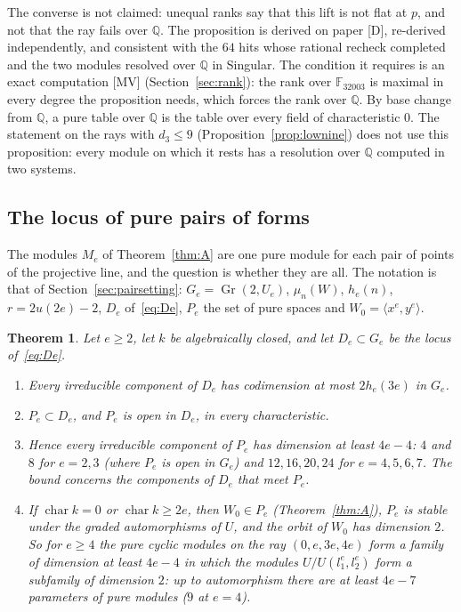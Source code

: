 \documentclass[11pt]{article}
\newtheorem{thmletter}{Theorem}
\theoremstyle{definition}
\theoremstyle{remark}
\newcommand{\Q}{\mathbb{Q}}
\newcommand{\F}{\mathbb{F}}
\newcommand{\ch}{\operatorname{char}}
\begin{document}
The converse is not claimed: unequal ranks say that this lift is not flat at $p$, and not that the ray fails over $\Q$. The proposition is derived on paper [D], re-derived independently, and consistent with the $64$ hits whose rational recheck completed and the two modules resolved over $\Q$ in Singular. The condition it requires is an exact computation [MV] (Section~\ref{sec:rank}): the rank over $\F_{32003}$ is maximal in every degree the proposition needs, which forces the rank over $\Q$. By base change from $\Q$, a pure table over $\Q$ is the table over every field of characteristic $0$. The statement on the rays with $d_3\le9$ (Proposition~\ref{prop:lownine}) does not use this proposition: every module on which it rests has a resolution over $\Q$ computed in two systems.

\subsection{The locus of pure pairs of forms}
\label{sec:family}

The modules $M_e$ of Theorem~\ref{thm:A} are one pure module for each pair of points of the projective line, and the question is whether they are all. The notation is that of Section~\ref{sec:pairsetting}: $G_e=\operatorname{Gr}(2,U_e)$, $\mu_n(W)$, $h_e(n)$, $r=2u(2e)-2$, $D_e$ of~\eqref{eq:De}, $P_e$ the set of pure spaces and $W_0=\langle x^e,y^e\rangle$.

\begin{thmletter}\label{thm:family}
Let $e\ge2$, let $k$ be algebraically closed, and let $D_e\subset G_e$ be the locus of~\eqref{eq:De}.
\begin{enumerate}
\item[(a)] Every irreducible component of $D_e$ has codimension at most $2h_e(3e)$ in $G_e$.
\item[(b)] $P_e\subset D_e$, and $P_e$ is open in $D_e$, in every characteristic.
\item[(c)] Hence every irreducible component of $P_e$ has dimension at least $4e-4$: $4$ and $8$ for $e=2,3$ (where $P_e$ is open in $G_e$) and $12,16,20,24$ for $e=4,5,6,7$. The bound concerns the components of $D_e$ that meet $P_e$.
\item[(d)] If $\ch k=0$ or $\ch k\ge2e$, then $W_0\in P_e$ (Theorem~\ref{thm:A}), $P_e$ is stable under the graded automorphisms of $U$, and the orbit of $W_0$ has dimension $2$. So for $e\ge4$ the pure cyclic modules on the ray $(0,e,3e,4e)$ form a family of dimension at least $4e-4$ in which the modules $U/U(l_1^e,l_2^e)$ form a subfamily of dimension $2$: up to automorphism there are at least $4e-7$ parameters of pure modules ($9$ at $e=4$).
\end{enumerate}
\end{thmletter}
\end{document}
